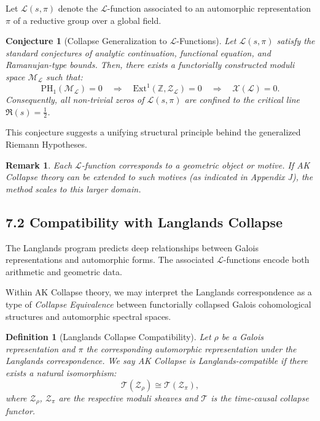 \documentclass[11pt]{article}
\newtheorem{definition}[theorem]{Definition}
\newtheorem{remark}[theorem]{Remark}
\newcommand{\Sha}{\mathcal{X}}
\newtheorem{conjecture}{Conjecture}[section]
\begin{document}
Let $\mathcal{L}(s, \pi)$ denote the $\mathcal{L}$-function associated to an automorphic representation $\pi$ of a reductive group over a global field.

\begin{conjecture}[Collapse Generalization to $\mathcal{L}$-Functions]
Let $\mathcal{L}(s, \pi)$ satisfy the standard conjectures of analytic continuation, functional equation, and Ramanujan-type bounds.  
Then, there exists a functorially constructed moduli space $\mathcal{M}_{\mathcal{L}}$ such that:
\[
\mathrm{PH}_1(\mathcal{M}_{\mathcal{L}}) = 0 \quad \Rightarrow \quad \mathrm{Ext}^1(\mathbb{Z}, \mathcal{Z}_{\mathcal{L}}) = 0 \quad \Rightarrow \quad \Sha(\mathcal{L}) = 0.
\]
Consequently, all non-trivial zeros of $\mathcal{L}(s, \pi)$ are confined to the critical line $\Re(s) = \tfrac{1}{2}$.
\end{conjecture}

This conjecture suggests a unifying structural principle behind the generalized Riemann Hypotheses.

\begin{remark}
Each $\mathcal{L}$-function corresponds to a geometric object or motive.  
If AK Collapse theory can be extended to such motives (as indicated in Appendix J), the method scales to this larger domain.
\end{remark}

\subsection{7.2 Compatibility with Langlands Collapse}

The Langlands program predicts deep relationships between Galois representations and automorphic forms.  
The associated $\mathcal{L}$-functions encode both arithmetic and geometric data.

Within AK Collapse theory, we may interpret the Langlands correspondence as a type of \emph{Collapse Equivalence}  
between functorially collapsed Galois cohomological structures and automorphic spectral spaces.

\begin{definition}[Langlands Collapse Compatibility]
Let $\rho$ be a Galois representation and $\pi$ the corresponding automorphic representation under the Langlands correspondence.  
We say AK Collapse is Langlands-compatible if there exists a natural isomorphism:
\[
\mathcal{T}(\mathcal{Z}_\rho) \cong \mathcal{T}(\mathcal{Z}_\pi),
\]
where $\mathcal{Z}_\rho$, $\mathcal{Z}_\pi$ are the respective moduli sheaves and $\mathcal{T}$ is the time-causal collapse functor.
\end{definition}
\end{document}
